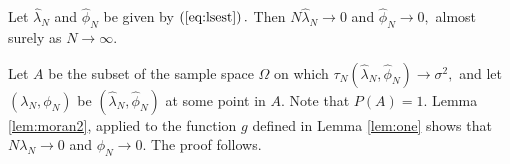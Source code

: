 \begin{theorem}
\label{th:one}Let $\widehat{\lambda}_{N}$ and $\widehat{\phi}_{N}$ be given by
$\left(  \ref{eq:lsest}\right)  .$ Then $N\widehat{\lambda}_{N}\rightarrow0$
and $\widehat{\phi}_{N}\rightarrow0,$ almost surely as $N\rightarrow\infty.$
\end{theorem}

\begin{IEEEproof}
Let $A$ be the subset of the sample space $\Omega$ on which $\tau_{N}\left(
\widehat{\lambda}_{N},\widehat{\phi}_{N}\right)  \rightarrow\sigma^{2},$ and
let $\left(  \lambda_{N},\phi_{N}\right)  $ be $\left(  \widehat{\lambda}%
_{N},\widehat{\phi}_{N}\right)  $ at some point in $A.$ Note that $P\left(
A\right)  =1.$ Lemma \ref{lem:moran2}, applied to the function $g$ defined in
Lemma \ref{lem:one} shows that $N\lambda_{N}\rightarrow0$ and $\phi
_{N}\rightarrow0$. The proof follows.
\end{IEEEproof}

